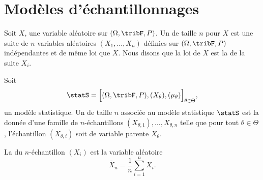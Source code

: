 \section{Modèles d'échantillonnages}

Soit \( X\), une variable aléatoire sur \( (\Omega,\tribF,P)\). Un  de taille \( n\) pour \( X\) est une suite de \( n\) variables aléatoires \( (X_1,\ldots,X_n)\) définies sur \( (\Omega,\tribF,P)\) indépendantes et de même loi que \( X\). Nous disons que la loi de \( X\) est la  de la suite \( X_i\).

\begin{definition}
    Soit
    \begin{equation}
        \statS=\Big[ (\Omega,\tribF,P),(X_{\theta}),(\mu_{\theta}) \Big]_{\theta\in\Theta},
    \end{equation}
    un modèle statistique. Un  de taille \( n\) associée au modèle statistique \( \statS\) est la donnée d'une famille de \( n\)-échantillons \( (X_{\theta,1}),\ldots,X_{\theta,n}\) telle que pour tout \( \theta\in\Theta\), l'échantillon \( (X_{\theta,i})\) soit de variable parente \( X_{\theta}\).
\end{definition}

La  du \( n\)-échantillon \( (X_i)\) est la variable aléatoire
\begin{equation}
    \bar X_n=\frac{1}{ n }\sum_{i=1}^{n}X_i.
\end{equation}

